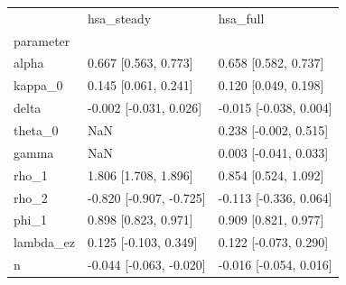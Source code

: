 \begin{tabular}{lll}
\toprule
 & hsa\_steady & hsa\_full \\
parameter &  &  \\
\midrule
alpha & 0.667 [0.563, 0.773] & 0.658 [0.582, 0.737] \\
kappa\_0 & 0.145 [0.061, 0.241] & 0.120 [0.049, 0.198] \\
delta & -0.002 [-0.031, 0.026] & -0.015 [-0.038, 0.004] \\
theta\_0 & NaN & 0.238 [-0.002, 0.515] \\
gamma & NaN & 0.003 [-0.041, 0.033] \\
rho\_1 & 1.806 [1.708, 1.896] & 0.854 [0.524, 1.092] \\
rho\_2 & -0.820 [-0.907, -0.725] & -0.113 [-0.336, 0.064] \\
phi\_1 & 0.898 [0.823, 0.971] & 0.909 [0.821, 0.977] \\
lambda\_ez & 0.125 [-0.103, 0.349] & 0.122 [-0.073, 0.290] \\
n & -0.044 [-0.063, -0.020] & -0.016 [-0.054, 0.016] \\
\bottomrule
\end{tabular}
